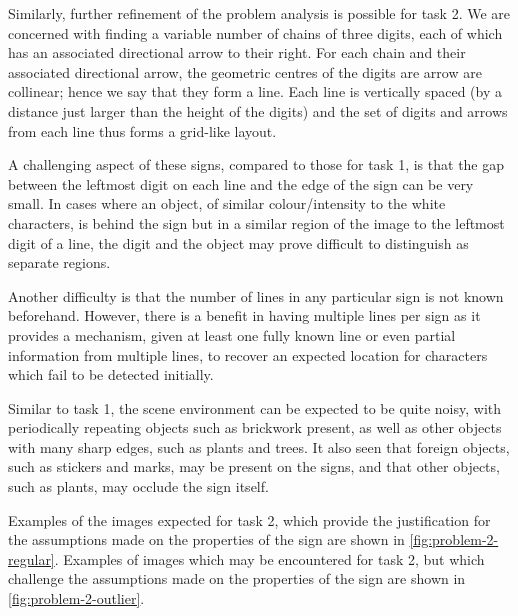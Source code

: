 \documentclass{article}
\begin{document}
Similarly, further refinement of the problem analysis is possible for task 2.
We are concerned with finding a variable number of chains of three digits, each
of which has an associated directional arrow to their right.
For each chain and their associated directional arrow, the geometric centres of
the digits are arrow are collinear; hence we say that they form a line.
Each line is vertically spaced (by a distance just larger than the height of the
digits) and the set of digits and arrows from each line thus forms a grid-like
layout.

A challenging aspect of these signs, compared to those for task 1, is that the
gap between the leftmost digit on each line and the edge of the sign can be very
small.
In cases where an object, of similar colour/intensity to the white characters,
is behind the sign but in a similar region of the image to the leftmost digit of
a line, the digit and the object may prove difficult to distinguish as separate
regions.

Another difficulty is that the number of lines in any particular sign is not
known beforehand.
However, there is a benefit in having multiple lines per sign as it provides a
mechanism, given at least one fully known line or even partial information from
multiple lines, to recover an expected location for characters which fail to be
detected initially.

Similar to task 1, the scene environment can be expected to be quite noisy, with
periodically repeating objects such as brickwork present, as well as other
objects with many sharp edges, such as plants and trees.
It also seen that foreign objects, such as stickers and marks, may be present on
the signs, and that other objects, such as plants, may occlude the sign itself.

Examples of the images expected for task 2, which provide the justification for
the assumptions made on the properties of the sign are shown in
\autoref{fig:problem-2-regular}.
Examples of images which may be encountered for task 2, but which challenge the
assumptions made on the properties of the sign are shown in
\autoref{fig:problem-2-outlier}.
\end{document}
